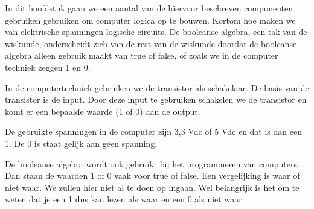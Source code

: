 In dit hoofdstuk gaan we een aantal van de hiervoor beschreven componenten gebruiken gebruiken om computer logica op te bouwen. Kortom hoe maken we van elektrische spanningen logische circuits. De booleanse algebra, een tak van de wiskunde, onderscheidt zich van de rest van de wiskunde doordat de booleanse algebra alleen gebruik maakt van true of false, of zoals we in de computer techniek zeggen 1 en 0.

In de computertechniek gebruiken we de transistor als schakelaar. De basis van de transistor is de input. Door deze input te gebruiken schakelen we de transistor en komt er een bepaalde waarde (1 of 0) aan de output.

De gebruikte spanningen in de computer zijn 3,3 Vdc of 5 Vdc en dat is dan een 1. De 0 is staat gelijk aan geen spanning.

De booleanse algebra wordt ook gebruikt bij het programmeren van computers. Dan staan de waarden 1 of 0 vaak voor true of false. Een vergelijking is waar of niet waar. We zullen hier niet al te doen op ingaan. Wel belangrijk is het om te weten dat je een 1 dus kan lezen als waar en een 0 als niet waar.

